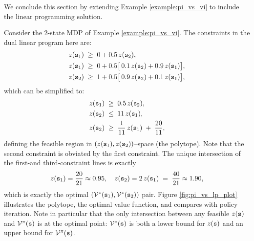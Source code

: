We conclude this section by extending Example \ref{example:pi_vs_vi} to include the linear programming solution.
\begin{example}
Consider the 2-state MDP of Example \ref{example:pi_vs_vi}.
The constraints in the dual linear program here are:
\begin{equation*}
    \begin{split}
        z({\tt s}_1) 
    \;&\ge\; 0 + 0.5\,z({\tt s}_2),\\
    z({\tt s}_1) 
    \;&\ge\; 0 + 0.5\bigl[\,0.1\,z({\tt s}_2) + 0.9\,z({\tt s}_1)\bigr],\\
    z({\tt s}_2) 
    \;&\ge\; 1 + 0.5\bigl[\,0.9\,z({\tt s}_2) + 0.1\,z({\tt s}_1)\bigr],
    \end{split}
\end{equation*}
which can be simplified to:
\begin{equation*}
    \begin{split}
    z({\tt s}_1) \;&\ge\; 0.5\,z({\tt s}_2),\\
    z({\tt s}_2) \;&\le\; 11\,z({\tt s}_1),\\
    z({\tt s}_2) \;&\ge\; \frac{1}{11} \,z({\tt s}_1) \;+\; \frac{20}{11},
    \end{split}
\end{equation*}
defining the feasible region in \((z({\tt s}_1), z({\tt s}_2))\)–space (the polytope).
Note that the second constraint is obviated by the first constraint. The unique intersection of the first‐and third‐constraint lines is exactly
\[
  z({\tt s}_1) = \frac{20}{21} \approx 0.95, 
  \quad 
  z({\tt s}_2) = 2\, z({\tt s}_1) \;=\; \frac{40}{21} \approx 1.90,
\]
which is exactly the optimal \((\mathcal{V}^*({\tt s}_1),\mathcal{V}^*({\tt s}_2))\) pair. Figure \ref{fig:pi_vs_lp_plot} illustrates the polytope, the optimal value function, and compares with policy iteration. Note in particular that the only intersection between any feasible $z({\tt s})$ and $\mathcal{V}^\pi({\tt s})$ is at the optimal point: $\mathcal{V}^*({\tt s})$ is both a lower bound for $z({\tt s})$ and an upper bound for $\mathcal{V}^\pi({\tt s})$. 


\end{example}
